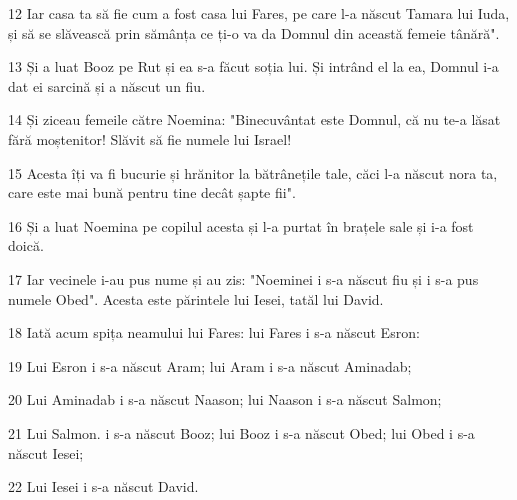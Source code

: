 \par 12 Iar casa ta să fie cum a fost casa lui Fares, pe care l-a născut Tamara lui Iuda, și să se slăvească prin sămânța ce ți-o va da Domnul din această femeie tânără".
\par 13 Și a luat Booz pe Rut și ea s-a făcut soția lui. Și intrând el la ea, Domnul i-a dat ei sarcină și a născut un fiu.
\par 14 Și ziceau femeile către Noemina: "Binecuvântat este Domnul, că nu te-a lăsat fără moștenitor! Slăvit să fie numele lui Israel!
\par 15 Acesta îți va fi bucurie și hrănitor la bătrânețile tale, căci l-a născut nora ta, care este mai bună pentru tine decât șapte fii".
\par 16 Și a luat Noemina pe copilul acesta și l-a purtat în brațele sale și i-a fost doică.
\par 17 Iar vecinele i-au pus nume și au zis: "Noeminei i s-a născut fiu și i s-a pus numele Obed". Acesta este părintele lui Iesei, tatăl lui David.
\par 18 Iată acum spița neamului lui Fares: lui Fares i s-a născut Esron:
\par 19 Lui Esron i s-a născut Aram; lui Aram i s-a născut Aminadab;
\par 20 Lui Aminadab i s-a născut Naason; lui Naason i s-a născut Salmon;
\par 21 Lui Salmon. i s-a născut Booz; lui Booz i s-a născut Obed; lui Obed i s-a născut Iesei;
\par 22 Lui Iesei i s-a născut David.


